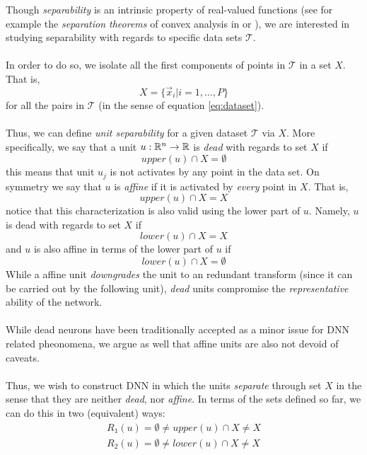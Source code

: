 Though \emph{separability} is an intrinsic property of real-valued functions (see for example the \emph{separation theorems} of convex analysis in \cite{florenzano2001ConvexAnalysis}  or \cite{Burges1998TutorialOnSVMForPatternRecognition}), we are interested in studying separability with regards to specific data sets $\mathcal{T}$. 
\\\\
In order to do so, we isolate all the first components of points in $\mathcal{T}$ in a set $X$. That is, 
\begin{equation}
    X = \{\vec{x}_i|i=1,\ldots,P\}
\end{equation}
for all the pairs in $\mathcal{T}$ (in the sense of equation \ref{eq:dataset}). 
\\\\
Thus, we can define \emph{unit separability} for a given dataset $\mathcal{T}$ via $X$. More specifically, we say that a unit $u:\mathbb{R}^{n}\rightarrow\mathbb{R}$ is \emph{dead} with regards to set $X$ if
\begin{equation}\label{eq:deadUnitVersion1}
 upper(u)\cap X = \emptyset 
\end{equation}
this means that unit $u_j$ is not activates by any point in the data set. On symmetry  we say that $u$ is \emph{affine} if it is activated by \emph{every} point in $X$. That is, 
\begin{equation}\label{eq:affineUnit}
 upper(u)\cap X = X
\end{equation}
notice that this characterization is also valid using the lower part of $u$. Namely, $u$ is dead with regards to set $X$ if
\begin{equation}\label{eq:deadNeuronVersion2}
    lower(u)\cap X = X
\end{equation}
and $u$ is also affine in terms of the lower part of $u$ if 
\begin{equation}
    lower(u)\cap X = \emptyset
\end{equation}
While a affine unit \emph{downgrades} the unit to an redundant transform (since it can be carried out by the following unit), \emph{dead} units compromise the \emph{representative} ability of the network.
\\\\
While dead neurons have been traditionally accepted as a minor issue for DNN related pheonomena, we argue as well that affine units are also not devoid of caveats.
\\\\
Thus, we wish to construct DNN in which the units \emph{separate} through set $X$ in the sense that they are neither \emph{dead}, nor \emph{affine}. In terms of the sets defined so far, we can do this in two (equivalent) ways:
\begin{equation}\label{eq:separabilityDefinition}
\begin{array}{c}
    R_1(u) = \emptyset \neq upper(u)\cap X \neq X\\
    R_2(u) = \emptyset \neq lower(u)\cap X \neq X\\
\end{array}
\end{equation}
